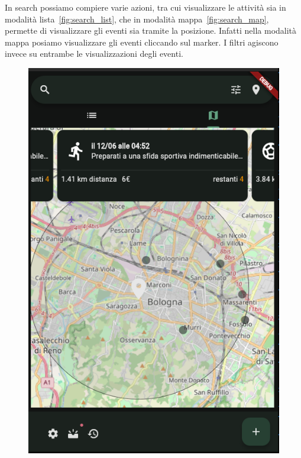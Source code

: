\documentclass[a4paper,12pt]{article}
\begin{document}
In search possiamo compiere varie azioni, tra cui visualizzare le attività sia in modalità lista~\ref{fig:search_list}, che in modalità mappa~\ref{fig:search_map}, permette di visualizzare gli eventi sia tramite la posizione.
Infatti nella modalità mappa posiamo visualizzare gli eventi cliccando sul marker.
I filtri agiscono invece su entrambe le visualizzazioni degli eventi.

\begin{figure}[h]
    \begin{minipage}{0.32\textwidth}
        \centering
        \label{fig:search:map}
        \includegraphics[width=1\linewidth]{img/search_map_page.png}
    \end{minipage}
    \begin{minipage}{0.32\textwidth}

\end{minipage}
\end{figure}
\end{document}
